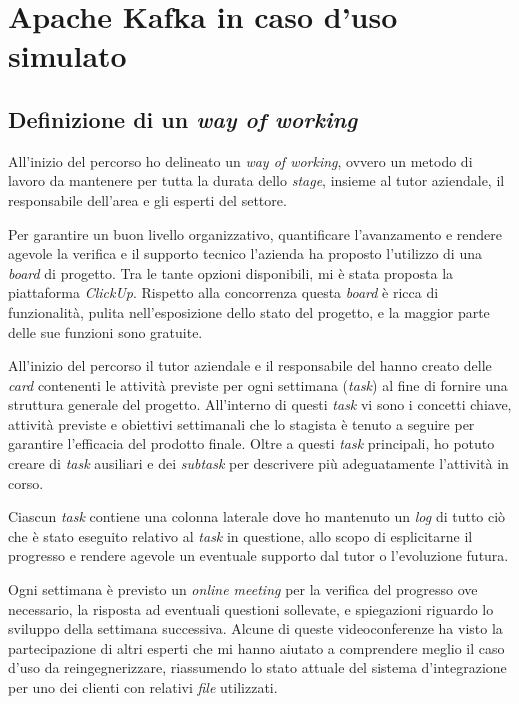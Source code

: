 \chapter{Apache Kafka in caso d’uso simulato}

\section{Definizione di un \textit{way of working}}

All'inizio del percorso ho delineato un \textit{way of working}, ovvero un metodo di lavoro da mantenere per tutta la durata dello \textit{stage}, insieme al tutor aziendale, il responsabile dell'area  e gli esperti del settore.

Per garantire un buon livello organizzativo, quantificare l'avanzamento e rendere agevole la verifica e il supporto tecnico l'azienda ha proposto l'utilizzo di una \textit{board} di progetto.
Tra le tante opzioni disponibili, mi è stata proposta la piattaforma \textit{ClickUp}.
Rispetto alla concorrenza questa \textit{board} è ricca di funzionalità, pulita nell'esposizione dello stato del progetto, e la maggior parte delle sue funzioni sono gratuite.

All'inizio del percorso il tutor aziendale e il responsabile del  hanno creato delle \textit{card} contenenti le attività previste per ogni settimana (\textit{task}) al fine di fornire una struttura generale del progetto.
All'interno di questi \textit{task} vi sono i concetti chiave, attività previste e obiettivi settimanali che lo stagista è tenuto a seguire per garantire l'efficacia del prodotto finale.
Oltre a questi \textit{task} principali, ho potuto creare di \textit{task} ausiliari e dei \textit{subtask} per descrivere più adeguatamente l'attività in corso.

Ciascun \textit{task} contiene una colonna laterale dove ho mantenuto un \textit{log} di tutto ciò che è stato eseguito relativo al \textit{task} in questione, allo scopo di esplicitarne il progresso e rendere agevole un eventuale supporto dal tutor o l'evoluzione futura.

Ogni settimana è previsto un \textit{online meeting} per la verifica del progresso ove necessario, la risposta ad eventuali questioni sollevate, e spiegazioni riguardo lo sviluppo della settimana successiva.
Alcune di queste videoconferenze ha visto la partecipazione di altri esperti che mi hanno aiutato a comprendere meglio il caso d'uso da reingegnerizzare, riassumendo lo stato attuale del sistema d'integrazione per uno dei clienti con relativi \textit{file} utilizzati.

